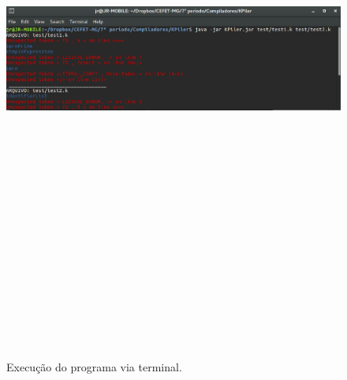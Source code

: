\begin{figure}[!h]
\label{fig:execution}
\centering
\includegraphics[width=16cm,height=20cm,keepaspectratio]{img/execution.png}
\caption{Execução do programa via terminal.}
\end{figure}